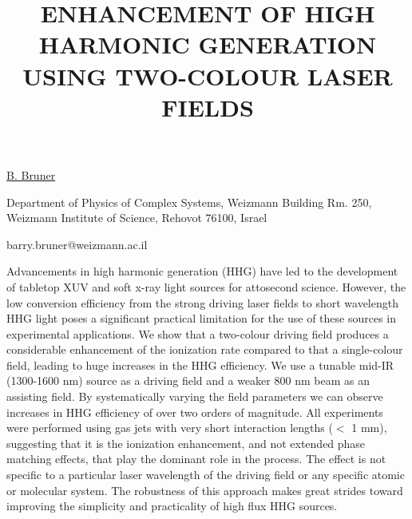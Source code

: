 \title{ENHANCEMENT OF HIGH HARMONIC GENERATION USING TWO-COLOUR LASER FIELDS}

\underline{B. Bruner} 

{\normalsize{\vspace{-4mm}
Department of Physics of Complex Systems,
Weizmann Building Rm. 250,
Weizmann Institute of Science,
Rehovot 76100, Israel

\email barry.bruner@weizmann.ac.il}}

Advancements in high harmonic generation (HHG) have led to the development of tabletop XUV and soft x-ray light sources for attosecond science.  However, the low conversion efficiency from the strong driving laser fields to short wavelength HHG light poses a significant practical limitation for the use of these sources in experimental applications.  We show that a two-colour driving field produces a considerable enhancement of the ionization rate compared to that a single-colour field, leading to huge increases in the HHG efficiency.  We use a tunable mid-IR (1300-1600 nm) source as a driving field and a weaker 800 nm beam as an assisting field.  By systematically varying the field parameters we can observe increases in HHG efficiency of over two orders of magnitude.  All experiments were performed using gas jets with very short interaction lengths ($<$ 1 mm), suggesting that it is the ionization enhancement, and not extended phase matching effects, that play the dominant role in the process. The effect is not specific to a particular laser wavelength of the driving field or any specific atomic or molecular system.  The robustness of this approach makes great strides toward improving the simplicity and practicality of high flux HHG sources.


\vspace{\baselineskip} 